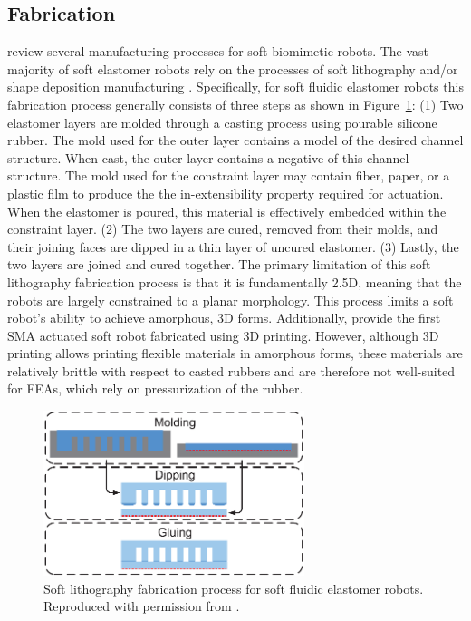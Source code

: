 \subsection{Fabrication}
\label{subsec:RW Fabrication}
\citet{cho2009review} review several manufacturing processes for soft biomimetic robots.
The vast majority of soft elastomer robots rely on the processes of soft lithography \citep{xia1998soft} and/or shape deposition manufacturing \citep{cham2002fast}.
Specifically, for soft fluidic elastomer robots this fabrication process generally consists of three steps as shown in Figure~\ref{fig:RW fabrication}: (1) Two elastomer layers are molded through a casting process using pourable silicone rubber. The mold used for the outer layer contains a model of the desired channel structure. When cast, the outer layer contains a negative of this channel structure. The mold used for the constraint layer may contain fiber, paper, or a plastic film to produce the the in-extensibility property required for actuation. When the elastomer is poured, this material is effectively embedded within the constraint layer.
(2) The two layers are cured, removed from their molds, and their joining faces are dipped in a thin layer of uncured elastomer.
(3) Lastly, the two layers are joined and cured together.
The primary limitation of this soft lithography fabrication process is that it is fundamentally 2.5D, meaning that the robots are largely constrained to a planar morphology.
This process limits a soft robot's ability to achieve amorphous, 3D forms.
Additionally, \citet{umedachi2013highly} provide the first SMA actuated soft robot fabricated using 3D printing.
However, although 3D printing allows printing flexible materials in amorphous forms, these materials are relatively brittle with respect to casted rubbers and are therefore not well-suited for FEAs, which rely on pressurization of the rubber.
\begin{figure}
  \centering
  \includegraphics[width=3in]{figures/relatedwork/fabrication.eps}
  \caption[Soft lithography fabrication process.]{Soft lithography fabrication process for soft fluidic elastomer robots. Reproduced with permission from \citet{onal2012modular}.}\label{fig:RW fabrication}
\end{figure} 


